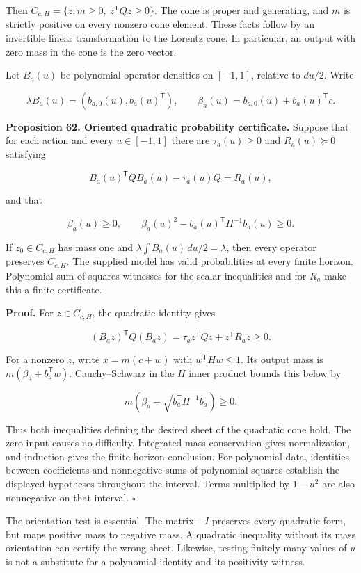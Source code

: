 \documentclass[11pt,letterpaper]{article}
\begin{document}
Then \(C_{c,H}=\{z:m\geq0,\ z^{\mathsf T}Qz\geq0\}\). The cone is proper
and generating, and \(m\) is strictly positive on every nonzero cone
element. These facts follow by an invertible linear transformation to
the Lorentz cone. In particular, an output with zero mass in the cone is
the zero vector.

Let \(B_a(u)\) be polynomial operator densities on \([-1,1]\), relative
to \(du/2\). Write

\[
\lambda B_a(u)=(b_{a,0}(u),b_a(u)^{\mathsf T}),\qquad
\beta_a(u)=b_{a,0}(u)+b_a(u)^{\mathsf T}c.
\]

\textbf{Proposition 62. Oriented quadratic probability certificate.}
Suppose that for each action and every \(u\in[-1,1]\) there are
\(\tau_a(u)\geq0\) and \(R_a(u)\succeq0\) satisfying

\[
\boxed{B_a(u)^{\mathsf T}QB_a(u)-\tau_a(u)Q=R_a(u),}
\]

and that

\[
\boxed{\beta_a(u)\geq0,\qquad
\beta_a(u)^2-b_a(u)^{\mathsf T}H^{-1}b_a(u)\geq0.}
\]

If \(z_0\in C_{c,H}\) has mass one and
\(\lambda\int B_a(u)\,du/2=\lambda\), then every operator preserves
\(C_{c,H}\). The supplied model has valid probabilities at every finite
horizon. Polynomial sum-of-squares witnesses for the scalar inequalities
and for \(R_a\) make this a finite certificate.

\textbf{Proof.} For \(z\in C_{c,H}\), the quadratic identity gives

\[
(B_a z)^{\mathsf T}Q(B_a z)
=\tau_a z^{\mathsf T}Qz+z^{\mathsf T}R_a z\geq0.
\]

For a nonzero \(z\), write \(x=m(c+w)\) with \(w^{\mathsf T}Hw\leq1\).
Its output mass is \(m(\beta_a+b_a^{\mathsf T}w)\). Cauchy--Schwarz in
the \(H\) inner product bounds this below by

\[
m\left(\beta_a-\sqrt{b_a^{\mathsf T}H^{-1}b_a}\right)\geq0.
\]

Thus both inequalities defining the desired sheet of the quadratic cone
hold. The zero input causes no difficulty. Integrated mass conservation
gives normalization, and induction gives the finite-horizon conclusion.
For polynomial data, identities between coefficients and nonnegative
sums of polynomial squares establish the displayed hypotheses throughout
the interval. Terms multiplied by \(1-u^2\) are also nonnegative on that
interval. \(\square\)

The orientation test is essential. The matrix \(-I\) preserves every
quadratic form, but maps positive mass to negative mass. A quadratic
inequality without its mass orientation can certify the wrong sheet.
Likewise, testing finitely many values of \(u\) is not a substitute for
a polynomial identity and its positivity witness.
\end{document}
